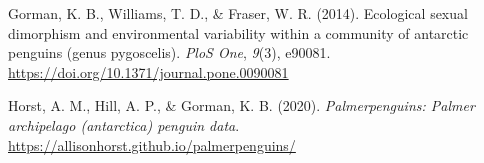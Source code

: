 \documentclass[
  a4paper,
]{report}
\newlength{\cslhangindent}
\newlength{\cslentryspacingunit} %
\newenvironment{CSLReferences}[2] %
 {%
  \setlength{\parindent}{0pt}
  \ifodd #1
  \let\oldpar\par
  \def\par{\hangindent=\cslhangindent\oldpar}
  \fi
  \setlength{\parskip}{#2\cslentryspacingunit}
 }%
 {}
\begin{document}


\hypertarget{refs}{}
\begin{CSLReferences}{1}{0}
\leavevmode{}%
Gorman, K. B., Williams, T. D., \& Fraser, W. R. (2014). Ecological
sexual dimorphism and environmental variability within a community of
antarctic penguins (genus pygoscelis). \emph{PloS One}, \emph{9}(3),
e90081. \url{https://doi.org/10.1371/journal.pone.0090081}

\leavevmode{}%
Horst, A. M., Hill, A. P., \& Gorman, K. B. (2020).
\emph{Palmerpenguins: Palmer archipelago (antarctica) penguin data}.
\url{https://allisonhorst.github.io/palmerpenguins/}

\end{CSLReferences}
\end{document}
